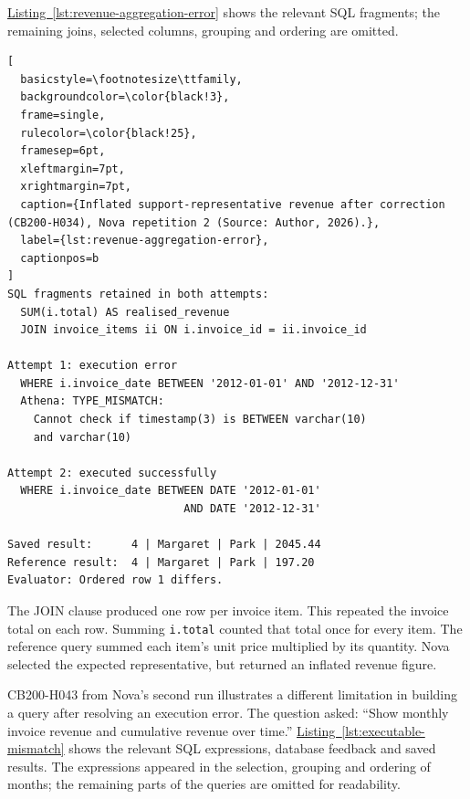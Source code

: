 \hyperref[lst:revenue-aggregation-error]{Listing~\ref*{lst:revenue-aggregation-error}} 
shows the relevant SQL fragments;
the remaining joins, selected columns, grouping and ordering are omitted.

\noindent\begin{minipage}{\linewidth}
\begin{lstlisting}[
  basicstyle=\footnotesize\ttfamily,
  backgroundcolor=\color{black!3},
  frame=single,
  rulecolor=\color{black!25},
  framesep=6pt,
  xleftmargin=7pt,
  xrightmargin=7pt,
  caption={Inflated support-representative revenue after correction (CB200-H034), Nova repetition 2 (Source: Author, 2026).},
  label={lst:revenue-aggregation-error},
  captionpos=b
]
SQL fragments retained in both attempts:
  SUM(i.total) AS realised_revenue
  JOIN invoice_items ii ON i.invoice_id = ii.invoice_id

Attempt 1: execution error
  WHERE i.invoice_date BETWEEN '2012-01-01' AND '2012-12-31'
  Athena: TYPE_MISMATCH:
    Cannot check if timestamp(3) is BETWEEN varchar(10)
    and varchar(10)

Attempt 2: executed successfully
  WHERE i.invoice_date BETWEEN DATE '2012-01-01'
                           AND DATE '2012-12-31'

Saved result:      4 | Margaret | Park | 2045.44
Reference result:  4 | Margaret | Park | 197.20
Evaluator: Ordered row 1 differs.
\end{lstlisting}
\end{minipage}

The JOIN clause produced one row per invoice item. 
This repeated the invoice total on each row. 
Summing \texttt{i.total} counted that total once for every item.
The reference query summed each item's unit price multiplied by its quantity.
Nova selected the expected representative, but returned an inflated revenue figure.

CB200-H043 from Nova's second run illustrates a different limitation 
in building a query after resolving an execution error. 
The question asked: ``Show monthly invoice revenue and
cumulative revenue over time.''
\hyperref[lst:executable-mismatch]{Listing~\ref*{lst:executable-mismatch}}
shows the relevant SQL expressions, database feedback and saved results.
The expressions appeared in the selection, grouping and ordering of months;
the remaining parts of the queries are omitted for readability.

